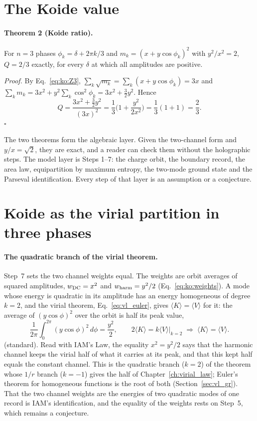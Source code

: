 \section{The Koide value}\label{sec:ko:value}
\paragraph{Theorem 2 (Koide ratio).} For $n=3$ phases $\phi_k=\delta+2\pi k/3$ and $m_k=(x+y\cos\phi_k)^2$ with $y^2/x^2=2$, $Q=2/3$ exactly, for
every $\delta$ at which all amplitudes are positive.

\emph{Proof.} By Eq.~\eqref{eq:ko:Z3}, $\sum_k\sqrt{m_k}=\sum_k(x+y\cos\phi_k)=3x$ and
$\sum_km_k=3x^2+y^2\sum_k\cos^2\phi_k=3x^2+\tfrac32y^2$. Hence
\begin{equation}
Q=\frac{3x^2+\tfrac32y^2}{(3x)^2}=\frac13\Big(1+\frac{y^2}{2x^2}\Big)=\frac13(1+1)=\frac23.\label{eq:ko:thm2}
\end{equation}
$\square$ \derived

The two theorems form the algebraic layer. Given the two-channel form and $y/x=\sqrt2$, they are exact, and a reader can check them without the
holographic steps. The model layer is Steps 1--7: the charge orbit, the boundary record, the area law, equipartition by maximum entropy, the
two-mode ground state and the Parseval identification. Every step of that layer is an assumption or a conjecture.

\section{Koide as the virial partition in three phases}\label{sec:ko:virial}
\paragraph{The quadratic branch of the virial theorem.} Step~7 sets the two channel weights equal. The weights are orbit averages of squared
amplitudes, $w_{\rm DC}=x^2$ and $w_{\rm harm}=y^2/2$ (Eq.~\eqref{eq:ko:weights}). A mode whose energy is quadratic in its amplitude has an energy
homogeneous of degree $k=2$, and the virial theorem, Eq.~\eqref{eq:vl_euler}, gives $\langle K\rangle=\langle V\rangle$ for it: the average of
$(y\cos\phi)^2$ over the orbit is half its peak value,
\begin{equation}
\frac1{2\pi}\int_0^{2\pi}(y\cos\phi)^2\,d\phi=\frac{y^2}{2},\qquad 2\langle K\rangle=k\langle V\rangle\big|_{k=2}\;\Rightarrow\;\langle K\rangle=\langle V\rangle .\label{eq:ko:k2}
\end{equation}
\derived{} (standard). Read with IAM's Law, the equality $x^2=y^2/2$ says that the harmonic channel keeps the virial half of what it carries at its
peak, and that this kept half equals the constant channel. \interp{} This is the quadratic branch ($k=2$) of the theorem whose $1/r$ branch
($k=-1$) gives the half of Chapter~\ref{ch:virial_law}; Euler's theorem for homogeneous functions is the root of both (Section~\ref{sec:vl_gr}).
\derived{} That the two channel weights are the energies of two quadratic modes of one record is IAM's identification, and the equality of the
weights rests on Step~5, which remains a conjecture. \conjecture

